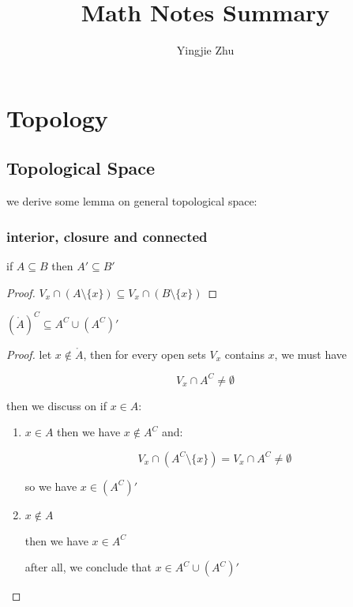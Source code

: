 \documentclass[11pt,a4paper]{book}
\title{Math Notes Summary}
\author{Yingjie Zhu}
\begin{document}
\maketitle

\tableofcontents

\chapter{Topology}

\section{Topological Space}

we derive some lemma on general topological space:

\subsection{interior, closure and connected}

\begin{lem}
    if $A \subseteq B$ then $A' \subseteq B'$
\end{lem}

\begin{proof}
    $V_x \cap (A \setminus \{ x \}) \subseteq V_x \cap (B \setminus \{ x \})$
\end{proof}

\begin{lem}
   $(\mathring{A}) ^C \subseteq A^C \cup (A^C)'$ 
\end{lem}

\begin{proof}
    let $x \notin \mathring{A} $, then for every open sets $V_x$ contains $x$, we must have

    \[
        V_x \cap A^C \ne \emptyset
    \]

    then we discuss on if $x \in A$:

    \begin{enumerate}
        \item $x \in A$
        then we have $x \notin A^C$ and:

        \[
            V_x \cap \left( A^C \setminus \{ x \} \right) = V_x \cap A^C \ne \emptyset
        \]

        so we have $x \in (A^C)'$


        \item $x \notin A$

        then we have $x \in A^C$

        after all, we conclude that $x \in A^C \cup (A^C)'$
    \end{enumerate}
\end{proof}
\end{document}
